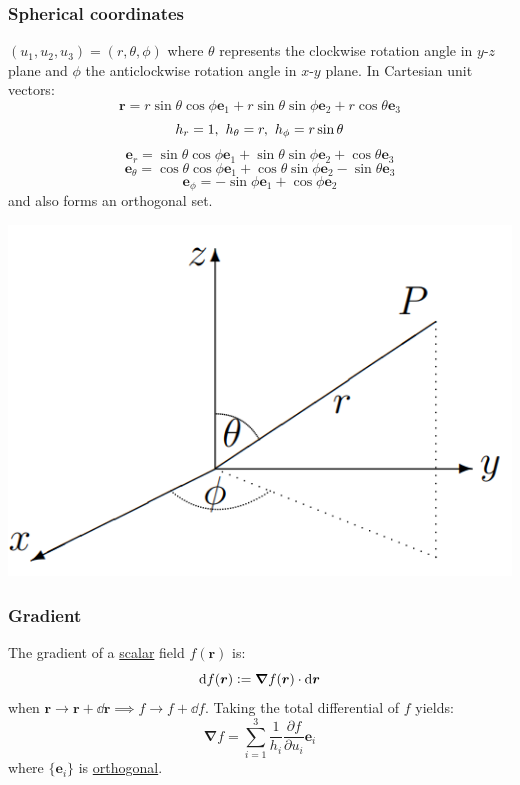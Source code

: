 \documentclass{article}
\newcommand{\deq}{\vcentcolon=}
\newcommand{\vc}[1]{\boldsymbol{#1}}
\begin{document}
\begin{multicols*}{3}
\subsubsection*{Spherical coordinates}
$(u_1,u_2,u_3)=(r,\theta,\phi)$ where
$\theta$ represents the clockwise
rotation angle in $y$-$z$ plane
and $\phi$ the anticlockwise
rotation angle in $x$-$y$ plane.
In Cartesian unit vectors:
$$\vc{r}=r\sin\theta\cos\phi\vc{e}_1
+r\sin\theta\sin\phi\vc{e}_2
+r\cos\theta\vc{e}_3$$
$$h_{r}=1,\hspace{0.05in} h_{\theta}=r,
\hspace{0.05in} h_{\phi}=r\sin\theta$$
$$\vc{e}_{r}=\sin\theta\cos\phi\vc{e}_1
+\sin\theta\sin\phi\vc{e}_2+\cos\theta\vc{e}_3$$
$$\vc{e}_{\theta}=\cos\theta\cos\phi\vc{e}_1
+\cos\theta\sin\phi\vc{e}_2-\sin\theta\vc{e}_3$$
$$\vc{e}_{\phi}=-\sin\phi\vc{e}_1+\cos\phi\vc{e}_2$$
and also forms an orthogonal set.
\begin{center}
    \includegraphics[scale=0.3]{f00.png}
\end{center}

\subsubsection*{Gradient}
The gradient of a \underline{scalar} field
$f(\vc{r})$ is:
$$\dd f(\vc{r})\deq\vc{\nabla}f(\vc{r})\cdot\dd\vc{r}$$
when $\vc{r}\rightarrow\vc{r}+\dd\vc{r}
\implies f\rightarrow f+\dd f$.
Taking the total differential of $f$ yields:
$$\vc{\nabla}f=\sum_{i=1}^{3}\frac{1}{h_i}
\frac{\partial f}{\partial u_i}\vc{e}_i$$
where $\{\vc{e}_i\}$ is \underline{orthogonal}.


\end{multicols*}
\end{document}
